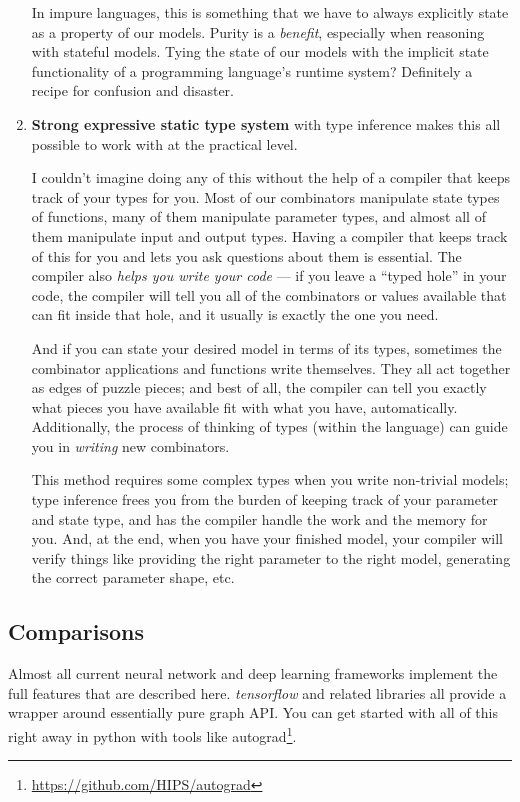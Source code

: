 \documentclass[]{article}
\renewcommand{\href}[2]{#2\footnote{\url{#1}}}
\begin{document}
\begin{enumerate}
  In impure languages, this is something that we have to always explicitly state
  as a property of our models. Purity is a \emph{benefit}, especially when
  reasoning with stateful models. Tying the state of our models with the
  implicit state functionality of a programming language's runtime system?
  Definitely a recipe for confusion and disaster.
\item
  \textbf{Strong expressive static type system} with type inference makes this
  all possible to work with at the practical level.

  I couldn't imagine doing any of this without the help of a compiler that keeps
  track of your types for you. Most of our combinators manipulate state types of
  functions, many of them manipulate parameter types, and almost all of them
  manipulate input and output types. Having a compiler that keeps track of this
  for you and lets you ask questions about them is essential. The compiler also
  \emph{helps you write your code} --- if you leave a ``typed hole'' in your
  code, the compiler will tell you all of the combinators or values available
  that can fit inside that hole, and it usually is exactly the one you need.

  And if you can state your desired model in terms of its types, sometimes the
  combinator applications and functions write themselves. They all act together
  as edges of puzzle pieces; and best of all, the compiler can tell you exactly
  what pieces you have available fit with what you have, automatically.
  Additionally, the process of thinking of types (within the language) can guide
  you in \emph{writing} new combinators.

  This method requires some complex types when you write non-trivial models;
  type inference frees you from the burden of keeping track of your parameter
  and state type, and has the compiler handle the work and the memory for you.
  And, at the end, when you have your finished model, your compiler will verify
  things like providing the right parameter to the right model, generating the
  correct parameter shape, etc.
\end{enumerate}

\subsection{Comparisons}\label{comparisons}

Almost all current neural network and deep learning frameworks implement the
full features that are described here. \emph{tensorflow} and related libraries
all provide a wrapper around essentially pure graph API. You can get started
with all of this right away in python with tools like
\href{https://github.com/HIPS/autograd}{autograd}.
\end{document}
